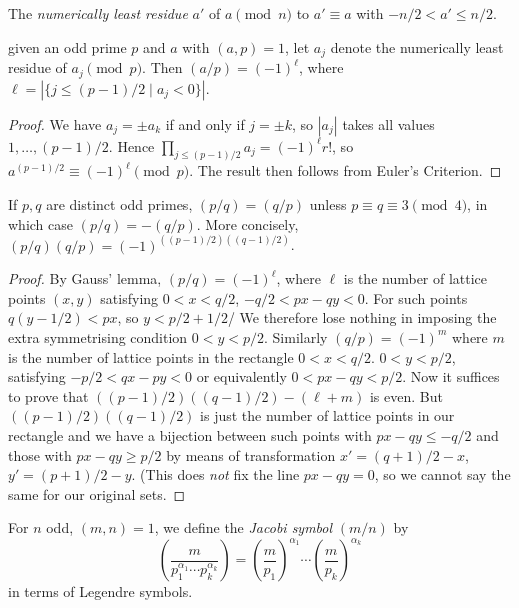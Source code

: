 \documentclass[a4paper, 10pt, twocolumn]{amsart}
\begin{document}
\begin{definition}
    The \emph{numerically least residue} $a'$ of $a \pmod n$ to $a' \equiv a$ with $-n/2 < a' \leq n/2$. 
\end{definition}

\begin{theorem}
given an odd prime $p$ and $a$ with $(a, p) = 1$, let $a_j$ denote the numerically least residue of $a_j \pmod{p}$. Then $(a/p) = (-1)^\ell$, where $\ell = |\{j \leq (p-1)/2 \mid a_j < 0\}|$.
\end{theorem}
\begin{proof}
    We have $a_j = \pm a_k$ if and only if $j = \pm k$, so $|a_j|$ takes all values $1, \dots, (p-1)/2$. Hence $\prod_{j \leq (p-1)/2} a_j = (-1)^\ell r!$, so $a^{(p-1)/2} \equiv (-1)^\ell \pmod{p}$. The result then follows from Euler's Criterion.
\end{proof}

\begin{theorem}
If $p, q$ are distinct odd primes, $(p/q) = (q/p)$ unless $p \equiv q \equiv 3 \pmod{4}$, in which case $(p/q) = -(q/p)$. More concisely, $(p/q)(q/p) = (-1)^{((p-1)/2)((q-1)/2)}$.
\end{theorem}
\begin{proof}
    By Gauss' lemma, $(p/q) = (-1)^\ell$, where $\ell$ is the number of lattice points $(x, y)$ satisfying $0 < x< q/2$, $-q/2 < px - qy < 0$. For such points $q(y - 1/2) < px$, so $y < p/2 + 1/2$/ We therefore lose nothing in imposing the extra symmetrising condition $0 < y < p/2$. Similarly $(q/p) = (-1)^m$ where $m$ is the number of lattice points in the rectangle $0 < x < q/2$. $0 < y < p/2$, satisfying $-p/2 < qx - py < 0$ or equivalently $0 < px - qy < p/2$. Now it suffices to prove that $((p-1)/2)((q-1)/2) - (\ell + m)$ is even. But $((p-1)/2)((q-1)/2)$ is just the number of lattice points in our rectangle and we have a bijection between such points with $px - qy \leq -q/2$ and those with $px - qy \geq p/2$ by means of transformation $x' = (q+1)/2 - x$, $y' = (p + 1)/2 - y$. (This does \emph{not} fix the line $px - qy = 0$, so we cannot say the same for our original sets.
\end{proof}

\begin{definition}
    For $n$ odd, $(m, n) = 1$, we define the \emph{Jacobi symbol} $(m/n)$ by 
    $$
    \left(\frac{m}{p_1^{\alpha_1} \cdots p_k^{\alpha_k}}\right)
    = \left(\frac{m}{p_1}\right)^{\alpha_1} \cdots \left(\frac{m}{p_k}\right)^{\alpha_k}
    $$
    in terms of Legendre symbols.
\end{definition}
\end{document}
